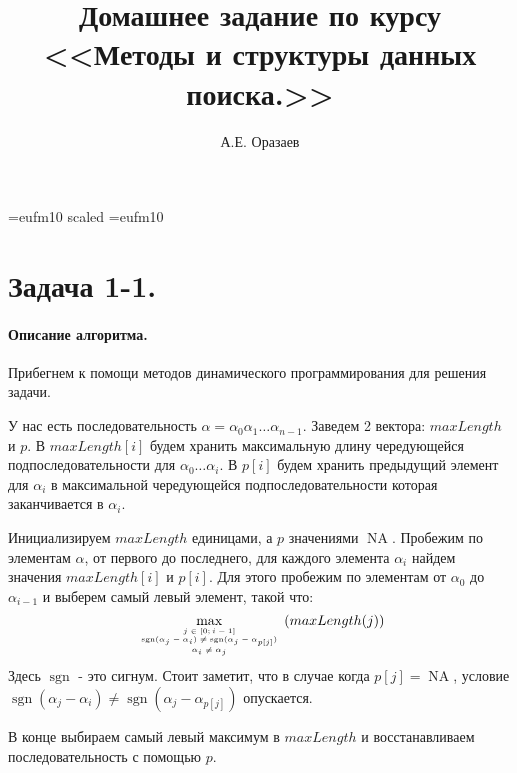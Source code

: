 \documentclass[12pt]{article}
\title{\bf Домашнее задание по курсу \\ <<Методы
и структуры данных поиска.>>}
\author{А.Е. Оразаев}
\date{}
\newcommand{\sgn}{\operatorname{sgn}}
\newcommand{\NA}{\operatorname{NA}}
\begin{document}
\voffset=-20mm 
\hoffset=-12mm
\font\Got=eufm10 scaled \font\Got=eufm10

\maketitle

\section{Задача 1-1.}
\paragraph{Описание алгоритма.}
Прибегнем к помощи методов динамического программирования для решения задачи.

У нас есть последовательность $ \alpha = \alpha_0\alpha_1\dots\alpha_{n-1} $. 
Заведем 2 вектора: $ maxLength $ и $ p $. В $ maxLength[i] $ будем хранить
максимальную длину чередующейся подпоследовательности для $ \alpha_0\dots\alpha_i $.
В $ p[i] $ будем хранить предыдущий элемент для $ \alpha_i $ в максимальной
чередующейся подпоследовательности которая заканчивается в $ \alpha_i $.

Инициализируем $ maxLength $ единицами, а $ p $ значениями $ \NA $.
Пробежим по элементам $ \alpha $, от первого до последнего, для каждого элемента
$ \alpha_i $ найдем значения $ maxLength[i] $ и $ p[i] $. Для этого 
пробежим по элементам от $ \alpha_0 $ до $ \alpha_{i - 1} $ и выберем самый левый
элемент, такой что:
$$ 
    \max\limits_{\tiny\begin{array}{c} j \in [0; i - 1] \\ \sgn(\alpha_j - \alpha_i) \ne \sgn(\alpha_j - \alpha_{p[j]}) \\ \alpha_i \ne \alpha_j \end{array} } (maxLength(j))
$$
Здесь $ \sgn $ - это сигнум. Стоит заметит, что в случае когда $ p[j] = \NA $, условие $ \sgn(\alpha_j - \alpha_i) \ne \sgn(\alpha_j - \alpha_{p[j]}) $ опускается.

В конце выбираем самый левый максимум в $ maxLength $ и восстанавливаем последовательность с помощью $ p $.
\end{document}
